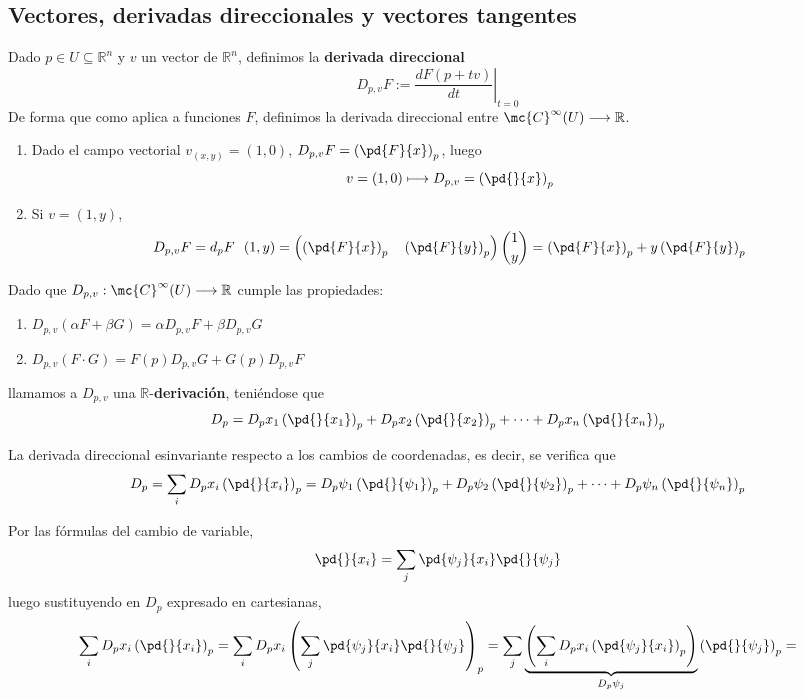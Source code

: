 \subsection{Vectores, derivadas direccionales y vectores tangentes}
\begin{defi}
    Dado $p \in U \subseteq \mathbb{R}^n$ y $v$ un vector de $\mathbb{R}^n$, definimos la \textbf{derivada direccional} $$D_{p,v}F:=\left.\dfrac{dF(p+tv)}{dt}\right|_{t=0}$$
    De forma que como aplica a funciones $F$, definimos la derivada direccional entre $\mc{C}^{\infty}(U)\longrightarrow \mathbb{R}$.
\end{defi}
\begin{ejes}
    \begin{enumerate}
        \item Dado el campo vectorial $v_{(x,y)}=(1,0)$, $D_{p,v}F=\left(\pd{F}{x}\right)_p$, luego
        $$v=(1,0) \longmapsto D_{p,v}=\left( \pd{}{x}\right)_p$$
        \item Si $v=(1,y)$,
        $$D_{p,v}F=d_pF \: \: \: (1,y)=\left( \left(\pd{F}{x}\right)_p \quad \left(\pd{F}{y}\right)_p\right) {1 \choose y}=\left(\pd{F}{x}\right)_p+y\left(\pd{F}{y}\right)_p$$
    \end{enumerate}
\end{ejes}
\begin{propi}
Dado que $D_{p,v}:\mc{C}^{\infty}(U) \longrightarrow \mathbb{R}$ cumple las propiedades:
\begin{enumerate}
    \item $D_{p,v}(\alpha F + \beta G)=\alpha D_{p,v}F + \beta D_{p,v} G$
    \item $D_{p,v}(F\cdot G)=F(p)D_{p,v}G+G(p)D_{p,v}F$
\end{enumerate}
llamamos a $D_{p,v}$ una $\mathbb{R}$-\textbf{derivación}, teniéndose que
$$D_p=D_px_1\left(\pd{}{x_1}\right)_p + D_px_2\left(\pd{}{x_2}\right)_p + \cdots + D_px_n\left(\pd{}{x_n}\right)_p $$
\end{propi}
\begin{prop}
La derivada direccional esinvariante respecto a los cambios de coordenadas, es decir, se verifica que $$D_p=\sum_i D_px_i \left( \pd{}{x_i}\right)_p=D_p\psi_1\left(\pd{}{\psi_1}\right)_p + D_p\psi_2\left(\pd{}{\psi_2}\right)_p + \cdots + D_p\psi_n\left(\pd{}{\psi_n}\right)_p $$
\end{prop}
\begin{dem}
Por las fórmulas del cambio de variable,
$$\pd{}{x_i}=\sum_{j} \pd{\psi_j}{x_i} \pd{}{\psi_j}$$
luego sustituyendo en $D_p$ expresado en cartesianas, 
$$\sum_i D_px_i \left(\pd{}{x_i} \right)_p=\sum_i D_px_i \left(\sum_{j} \pd{\psi_j}{x_i} \pd{}{\psi_j}\right)_p=\sum_j \underbrace{\left( \sum_i D_px_i \left( \pd{\psi_j}{x_i}\right)_p\right)}_{D_p\psi_j} \left( \pd{}{\psi_j}\right)_p=$$
\end{dem}
